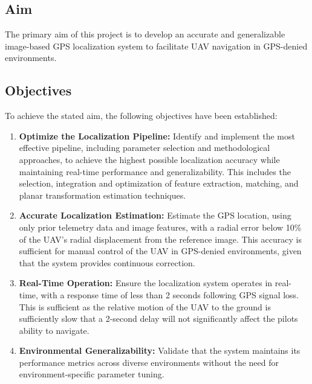 \subsection{Aim}
The primary aim of this project is to develop an accurate and generalizable image-based GPS localization system to facilitate UAV navigation in GPS-denied environments.

\subsection{Objectives}
To achieve the stated aim, the following objectives have been established:

\begin{enumerate}
    \item \textbf{Optimize the Localization Pipeline:} Identify and implement the most effective pipeline, including parameter selection and methodological approaches, to achieve the highest possible localization accuracy while maintaining real-time performance and generalizability. This includes the selection, integration and optimization of feature extraction, matching, and planar transformation estimation techniques.
    
    \item \textbf{Accurate Localization Estimation:} Estimate the GPS location, using only prior telemetry data and image features, with a radial error below 10\% of the UAV's radial displacement from the reference image. This accuracy is sufficient for manual control of the UAV in GPS-denied environments, given that the system provides continuous correction.

    \item \textbf{Real-Time Operation:} Ensure the localization system operates in real-time, with a response time of less than 2 seconds following GPS signal loss. This is sufficient as the relative motion of the UAV to the ground is sufficiently slow that a 2-second delay will not significantly affect the pilots ability to navigate.
    
    \item \textbf{Environmental Generalizability:} Validate that the system maintains its performance metrics across diverse environments without the need for environment-specific parameter tuning.
\end{enumerate}

